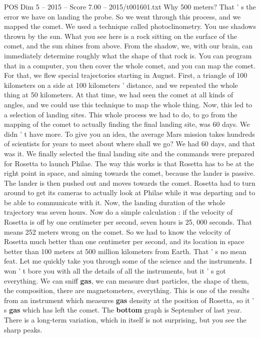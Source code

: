 \begin{textsample}{POS Dim 5 – 2015 – Score 7.00 – 2015/t001601.txt}
Why 500 meters?
That ' s the error we have on landing the probe.
So we went through this process, and we mapped the comet.
We used a technique called photoclinometry.
You use shadows thrown by the sun.
What you see here is a rock sitting on the surface of the comet, and the sun shines from above.
From the shadow, we, with our brain, can immediately determine roughly what the shape of that rock is.
You can program that in a computer, you then cover the whole comet, and you can map the comet.
For that, we flew special trajectories starting in August.
First, a triangle of 100 kilometers on a side at 100 kilometers ' distance, and we repeated the whole thing at 50 kilometers.
At that time, we had seen the comet at all kinds of angles, and we could use this technique to map the whole thing.
Now, this led to a selection of landing sites.
This whole process we had to do, to go from the mapping of the comet to actually finding the final landing site, was 60 days.
We didn ' t have more.
To give you an idea, the average Mars mission takes hundreds of scientists for years to meet about where shall we go?
We had 60 days, and that was it.
We finally selected the final landing site and the commands were prepared for Rosetta to launch Philae.
The way this works is that Rosetta has to be at the right point in space, and aiming towards the comet, because the lander is passive.
The lander is then pushed out and moves towards the comet.
Rosetta had to turn around to get its cameras to actually look at Philae while it was departing and to be able to communicate with it.
Now, the landing duration of the whole trajectory was seven hours.
Now do a simple calculation : if the velocity of Rosetta is off by one centimeter per second, seven hours is 25, 000 seconds.
That means 252 meters wrong on the comet.
So we had to know the velocity of Rosetta much better than one centimeter per second, and its location in space better than 100 meters at 500 million kilometers from Earth.
That ' s no mean feat.
Let me quickly take you through some of the science and the instruments.
I won ' t bore you with all the details of all the instruments, but it ' s got everything.
We can sniff \textbf{gas}, we can measure dust particles, the shape of them, the composition, there are magnetometers, everything.
This is one of the results from an instrument which measures \textbf{gas} density at the position of Rosetta, so it ' s \textbf{gas} which has left the comet.
The \textbf{bottom} graph is September of last year.
There is a long-term variation, which in itself is not surprising, but you see the sharp peaks.

\end{textsample}

